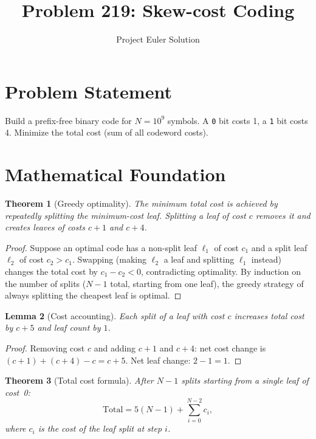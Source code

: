 \documentclass[12pt]{article}
\title{Problem 219: Skew-cost Coding}
\author{Project Euler Solution}
\date{}
\newtheorem{theorem}{Theorem}
\newtheorem{lemma}[theorem]{Lemma}
\begin{document}
\maketitle

\section{Problem Statement}

Build a prefix-free binary code for $N = 10^9$ symbols. A \texttt{0} bit costs 1, a \texttt{1} bit costs 4. Minimize the total cost (sum of all codeword costs).

\section{Mathematical Foundation}

\begin{theorem}[Greedy optimality]
The minimum total cost is achieved by repeatedly splitting the minimum-cost leaf. Splitting a leaf of cost $c$ removes it and creates leaves of costs $c+1$ and $c+4$.
\end{theorem}

\begin{proof}
Suppose an optimal code has a non-split leaf $\ell_1$ of cost $c_1$ and a split leaf $\ell_2$ of cost $c_2 > c_1$. Swapping (making $\ell_2$ a leaf and splitting $\ell_1$ instead) changes the total cost by $c_1 - c_2 < 0$, contradicting optimality. By induction on the number of splits ($N-1$ total, starting from one leaf), the greedy strategy of always splitting the cheapest leaf is optimal.
\end{proof}

\begin{lemma}[Cost accounting]
Each split of a leaf with cost $c$ increases total cost by $c + 5$ and leaf count by $1$.
\end{lemma}

\begin{proof}
Removing cost $c$ and adding $c+1$ and $c+4$: net cost change is $(c{+}1)+(c{+}4)-c = c+5$. Net leaf change: $2-1=1$.
\end{proof}

\begin{theorem}[Total cost formula]
After $N-1$ splits starting from a single leaf of cost~0:
\[
\mathrm{Total} = 5(N-1) + \sum_{i=0}^{N-2} c_i,
\]
where $c_i$ is the cost of the leaf split at step $i$.
\end{theorem}
\end{document}
